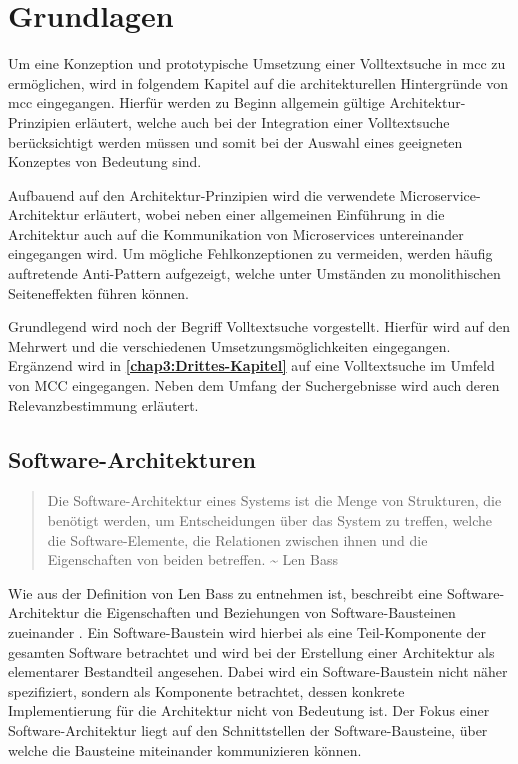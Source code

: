 \chapter{Grundlagen\label{chap2:Zweites-Kapitel}}

Um eine Konzeption und prototypische Umsetzung einer Volltextsuche in \gls{mcc} zu ermöglichen, wird in folgendem Kapitel auf die architekturellen Hintergründe von \gls{mcc} eingegangen. Hierfür werden zu Beginn allgemein gültige Architektur-Prinzipien erläutert, welche auch bei der Integration einer Volltextsuche berücksichtigt werden müssen und somit bei der Auswahl eines geeigneten Konzeptes von Bedeutung sind.

Aufbauend auf den Architektur-Prinzipien wird die verwendete Microservice-Architektur erläutert, wobei neben einer allgemeinen Einführung in die Architektur auch auf die Kommunikation von Microservices untereinander eingegangen wird. Um mögliche Fehlkonzeptionen zu vermeiden, werden häufig auftretende Anti-Pattern aufgezeigt, welche unter Umständen zu monolithischen Seiteneffekten führen können.

Grundlegend wird noch der Begriff \glqq Volltextsuche\grqq{} vorgestellt. Hierfür wird auf den Mehrwert und die verschiedenen Umsetzungsmöglichkeiten eingegangen. Ergänzend wird in \textbf{\autoref{chap3:Drittes-Kapitel}} auf eine Volltextsuche im Umfeld von MCC eingegangen. Neben dem Umfang der Suchergebnisse wird auch deren Relevanzbestimmung erläutert.

\section{Software-Architekturen\label{sec2.1:Unterpunkt-1}}

\begin{quote}
    Die Software-Architektur eines Systems ist die Menge von Strukturen, die benötigt werden, um Entscheidungen über das System zu treffen, welche die Software-Elemente, die Relationen zwischen ihnen und die Eigenschaften von beiden betreffen. \textasciitilde{} Len Bass \cite[S. 4]{Bass.2013}
\end{quote}

Wie aus der Definition von Len Bass zu entnehmen ist, beschreibt eine Software-Architektur die Eigenschaften und Beziehungen von Software-Bausteinen zueinander \cite[S. 4]{Bass.2013}. Ein Software-Baustein wird hierbei als eine Teil-Komponente der gesamten Software betrachtet und wird bei der Erstellung einer Architektur als elementarer Bestandteil angesehen. Dabei wird ein Software-Baustein nicht näher spezifiziert, sondern als Komponente betrachtet, dessen konkrete Implementierung für die Architektur nicht von Bedeutung ist. Der Fokus einer Software-Architektur liegt auf den Schnittstellen der Software-Bausteine, über welche die Bausteine miteinander kommunizieren können.

